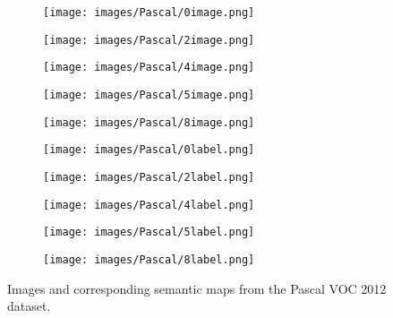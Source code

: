 \documentclass[10pt,twocolumn,letterpaper]{article}
\begin{document}
\begin{figure}[t]
    \centering
    \begin{adjustbox}{width=\columnwidth}
    \begin{subfigure}[b]{0.6\textwidth}
        \texttt{[image: images/Pascal/0image.png]}
    \end{subfigure}
    \hspace{0.01cm}
    \begin{subfigure}[b]{0.6\textwidth}
        \texttt{[image: images/Pascal/2image.png]}
    \end{subfigure}
    \hspace{0.01cm}
    \begin{subfigure}[b]{0.6\textwidth}
        \texttt{[image: images/Pascal/4image.png]}
    \end{subfigure}
    \hspace{0.01cm}
    \begin{subfigure}[b]{0.6\textwidth}
        \texttt{[image: images/Pascal/5image.png]}
    \end{subfigure}
    \hspace{0.01cm}
    \begin{subfigure}[b]{0.6\textwidth}
        \texttt{[image: images/Pascal/8image.png]}
    \end{subfigure}
    \end{adjustbox}
    \begin{adjustbox}{width=\columnwidth}
    \begin{subfigure}[b]{0.6\textwidth}
        \texttt{[image: images/Pascal/0label.png]}
    \end{subfigure}
    \hspace{0.01cm}
    \begin{subfigure}[b]{0.6\textwidth}
        \texttt{[image: images/Pascal/2label.png]}
    \end{subfigure}
    \hspace{0.01cm}
    \begin{subfigure}[b]{0.6\textwidth}
        \texttt{[image: images/Pascal/4label.png]}
    \end{subfigure}
    \hspace{0.01cm}
    \begin{subfigure}[b]{0.6\textwidth}
        \texttt{[image: images/Pascal/5label.png]}
    \end{subfigure}
    \hspace{0.01cm}
    \begin{subfigure}[b]{0.6\textwidth}
        \texttt{[image: images/Pascal/8label.png]}
    \end{subfigure}
    \end{adjustbox}
    
    \caption{Images and corresponding semantic maps from the Pascal VOC 2012 dataset.}
    \label{fig:pascal}
\end{figure}
\end{document}
